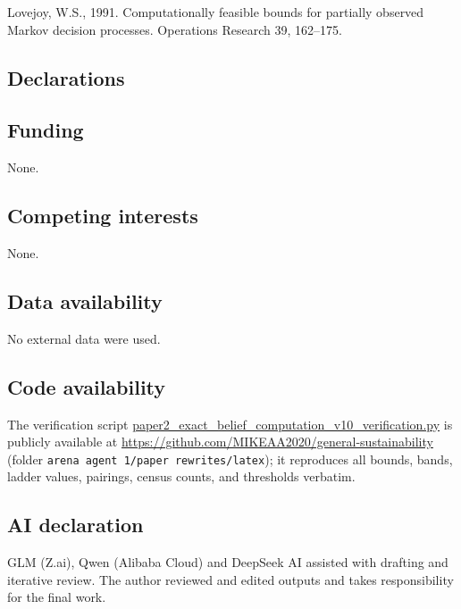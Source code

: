 \documentclass[10pt,twocolumn]{article}
\theoremstyle{plain}
\theoremstyle{definition}
\theoremstyle{remark}
\begin{document}
Lovejoy, W.S., 1991. Computationally feasible bounds for partially
observed Markov decision processes. Operations Research 39, 162--175.

\subsection*{Declarations}

\subsection*{Funding}
None.

\subsection*{Competing interests}
None.

\subsection*{Data availability}
No external data were used.

\subsection*{Code availability}
The verification script
\url{paper2_exact_belief_computation_v10_verification.py} is publicly
available at \url{https://github.com/MIKEAA2020/general-sustainability}
(folder \texttt{arena agent 1/paper rewrites/latex}); it reproduces all bounds, bands, ladder values, pairings,
census counts, and thresholds verbatim.

\subsection*{AI declaration}
GLM (Z.ai), Qwen (Alibaba Cloud) and DeepSeek AI assisted with drafting
and iterative review. The author reviewed and edited outputs and takes
responsibility for the final work.
\end{document}

